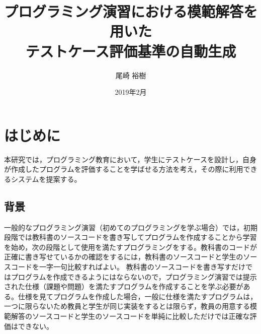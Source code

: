 \documentclass{tpu-sotu}
\author{尾崎 裕樹}
\title{プログラミング演習における模範解答を用いた\\テストケース評価基準の自動生成}
\date{2019年2月}
\begin{document}
%
\maketitle
\clearpage
{}
\tableofcontents
\clearpage
{}
%

%
\chapter{はじめに}
本研究では，プログラミング教育において，学生にテストケースを設計し，自身が作成したプログラムを評価することを学ばせる方法を考え，その際に利用できるシステムを提案する。
\section{背景}
一般的なプログラミング演習（初めてのプログラミングを学ぶ場合）では，初期段階では教科書のソースコードを書き写してプログラムを作成することから学習を始め，次の段階として使用を満たすプログラミングをする。教科書のコードが正確に書き写せているかの確認をするには，教科書のソースコードと学生のソースコードを一字一句比較すればよい。
教科書のソースコードを書き写すだけではプログラムを作成できるようにはならないので，プログラミング演習では提示された仕様（課題や問題）を満たすプログラムを作成することを学ぶ必要がある。仕様を見てプログラムを作成した場合，一般に仕様を満たすプログラムは，一つに限らないため教員と学生が同じ実装をするとは限らず，教員の用意する模範解答のソースコードと学生のソースコードを単純に比較しただけでは正確な評価はできない。
\end{document}
